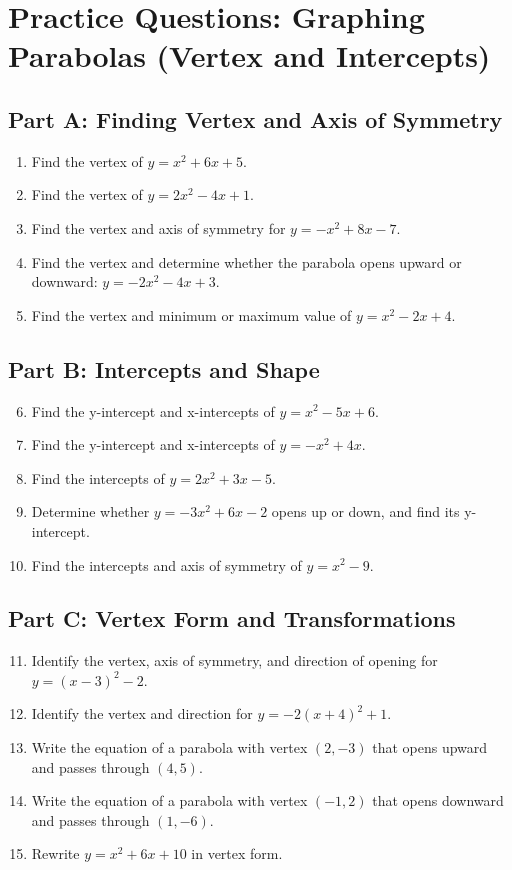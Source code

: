 \documentclass[14pt]{extarticle}
\begin{document}
\section*{Practice Questions: Graphing Parabolas (Vertex and Intercepts)}

\subsection*{Part A: Finding Vertex and Axis of Symmetry}
\begin{enumerate}
  \item Find the vertex of \(y = x^2 + 6x + 5.\)
  \item Find the vertex of \(y = 2x^2 - 4x + 1.\)
  \item Find the vertex and axis of symmetry for \(y = -x^2 + 8x - 7.\)
  \item Find the vertex and determine whether the parabola opens upward or downward: \(y = -2x^2 - 4x + 3.\)
  \item Find the vertex and minimum or maximum value of \(y = x^2 - 2x + 4.\)
\end{enumerate}

\subsection*{Part B: Intercepts and Shape}
\begin{enumerate}
  \setcounter{enumi}{5}
  \item Find the y-intercept and x-intercepts of \(y = x^2 - 5x + 6.\)
  \item Find the y-intercept and x-intercepts of \(y = -x^2 + 4x.\)
  \item Find the intercepts of \(y = 2x^2 + 3x - 5.\)
  \item Determine whether \(y = -3x^2 + 6x - 2\) opens up or down, and find its y-intercept.
  \item Find the intercepts and axis of symmetry of \(y = x^2 - 9.\)
\end{enumerate}

\subsection*{Part C: Vertex Form and Transformations}
\begin{enumerate}
  \setcounter{enumi}{10}
  \item Identify the vertex, axis of symmetry, and direction of opening for \(y = (x - 3)^2 - 2.\)
  \item Identify the vertex and direction for \(y = -2(x + 4)^2 + 1.\)
  \item Write the equation of a parabola with vertex \((2, -3)\) that opens upward and passes through \((4, 5)\).
  \item Write the equation of a parabola with vertex \((-1, 2)\) that opens downward and passes through \((1, -6)\).
  \item Rewrite \(y = x^2 + 6x + 10\) in vertex form.
\end{enumerate}
\end{document}
